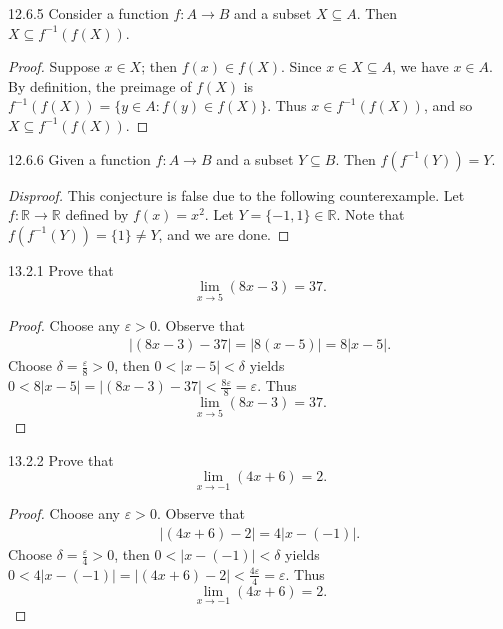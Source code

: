 \documentclass{exam}
\newcommand{\abs}[1]{\lvert#1\rvert}
\begin{document}
\begin{proposition}{12.6.5}
    Consider a function $f:A\rightarrow B$ and a subset $X\subseteq A$. Then $X\subseteq f^{-1}(f(X))$.
\end{proposition}

\begin{proof}
    Suppose $x\in X$; then $f(x)\in f(X)$. Since $x\in X\subseteq A$, we have $x\in A$. By definition, the preimage of $f(X)$ is $f^{-1}(f(X)) = \{y\in A:f(y)\in f(X)\}$. Thus $x\in f^{-1}(f(X))$, and so $X\subseteq f^{-1}(f(X))$.
\end{proof}

\begin{conjecture}{12.6.6}
    Given a function $f:A\rightarrow B$ and a subset $Y\subseteq B$. Then $f(f^{-1}(Y))=Y$.
\end{conjecture}

\begin{proof}[Disproof]
    This conjecture is false due to the following counterexample. Let $f:\mathbb R\rightarrow\mathbb R$ defined by $f(x) = x^2$. Let $Y=\{-1, 1\}\in\mathbb R$. Note that $f(f^{-1}(Y)) = \{1\} \neq Y$, and we are done.
\end{proof}

\begin{problem}{13.2.1}
    Prove that $$\lim_{x\to5}(8x-3)=37.$$
\end{problem}

\begin{proof}
    Choose any $\varepsilon > 0$. Observe that
    \begin{align*}
        \abs{(8x - 3) - 37} = \abs{8(x - 5)} = 8\abs{x-5}.
    \end{align*}
    Choose $\delta = \frac{\varepsilon}8>0$, then $0 < \abs{x-5} < \delta$ yields $0 < 8\abs{x-5} = \abs{(8x-3)-37} < \frac{8\varepsilon}8 = \varepsilon$. Thus $$\lim_{x\to5}(8x-3) = 37.$$
\end{proof}

\begin{problem}{13.2.2}
    Prove that $$\lim_{x\to-1}(4x+6)=2.$$
\end{problem}

\begin{proof}
    Choose any $\varepsilon > 0$. Observe that
    \begin{align*}
        \abs{(4x+6)-2} = 4\abs{x-(-1)}.
    \end{align*}
    Choose $\delta = \frac{\varepsilon}4 > 0$, then $0 < \abs{x-(-1)} < \delta$ yields $0 < 4\abs{x-(-1)} = \abs{(4x+6)-2} < \frac{4\varepsilon}4 = \varepsilon$. Thus $$\lim_{x\to-1}(4x+6)=2.$$
\end{proof}
\end{document}
